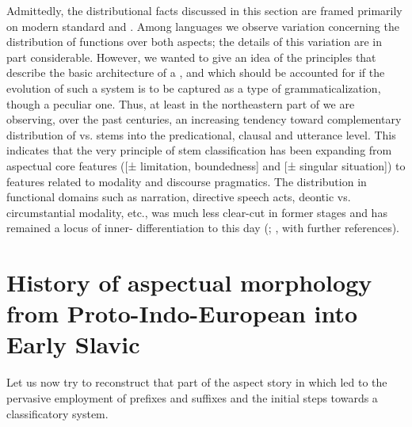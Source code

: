 \documentclass[output=paper]{langsci/langscibook}
\begin{document}
Admittedly, the distributional facts discussed in this section are framed primarily on modern standard  and . Among  languages we observe variation concerning the distribution of functions over both aspects; the details of this variation are in part considerable. However, we wanted to give an idea of the principles that describe the basic architecture of a , and which should be accounted for if the evolution of such a system is to be captured as a type of grammaticalization, though a peculiar one. Thus, at least in the northeastern part of  we are observing, over the past centuries, an increasing tendency toward complementary distribution of  vs.  stems into the predicational, clausal and utterance level. This indicates that the very principle of stem classification has been expanding from aspectual core features ([± limitation, boundedness] and [± singular situation]) to features related to modality and discourse pragmatics. The distribution in functional domains such as narration, directive speech acts, deontic vs. circumstantial modality, etc., was much less clear-cut in former stages and has remained a locus of inner- differentiation to this day (\citealt{Wiemer2008}; \citeyear{Wiemer2015}, with further references).

\section{History of aspectual morphology from Proto-Indo-European into Early Slavic}\label{sec:wiemerserzant:3}

Let us now try to reconstruct that part of the aspect story in  which led to the pervasive employment of prefixes and suffixes and the initial steps towards a classificatory system.
\end{document}
